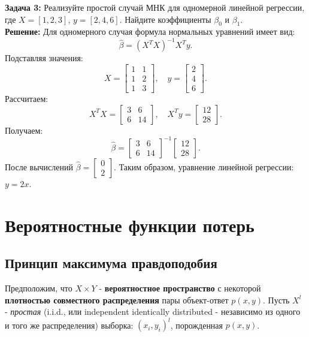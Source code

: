 \textbf{Задача 3:}
Реализуйте простой случай МНК для одномерной линейной регрессии, где \(X = [1, 2, 3]\), \(y = [2, 4, 6]\). Найдите коэффициенты \(\beta_0\) и \(\beta_1\). \\
\textbf{Решение:}
Для одномерного случая формула нормальных уравнений имеет вид:
\[
\hat{\beta} = (X^T X)^{-1} X^T y.
\]
Подставляя значения:
\[
X = \begin{bmatrix}
1 & 1 \\
1 & 2 \\
1 & 3
\end{bmatrix}, \quad y = \begin{bmatrix} 2 \\ 4 \\ 6 \end{bmatrix}.
\]
Рассчитаем:
\[
X^T X = \begin{bmatrix}
3 & 6 \\
6 & 14
\end{bmatrix}, \quad X^T y = \begin{bmatrix}
12 \\
28
\end{bmatrix}.
\]
Получаем:
\[
\hat{\beta} = \begin{bmatrix}
3 & 6 \\
6 & 14
\end{bmatrix}^{-1} \begin{bmatrix}
12 \\
28
\end{bmatrix}.
\]
После вычислений \(\hat{\beta} = \begin{bmatrix} 0 \\ 2 \end{bmatrix}\). Таким образом, уравнение линейной регрессии: \(y = 2x\).

\newpage

\section{Вероятностные функции потерь}

\subsection{Принцип максимума правдоподобия}

Предположим, что \(X\times Y\) - \textbf{вероятностное пространство} с некоторой \textbf{плотностью совместного распределения} пары объект-ответ \(p(x,y)\).
Пусть \(X^{l}\) - \textit{простая} (i.i.d., или independent identically distributed - независимо из одного и того же распределения) выборка: \({(x_{i}, y_{i})^{l}}\), порожденная \(p(x,y)\).

